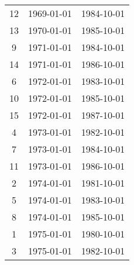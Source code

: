 % 
\begin{tabular}{ccc}
  \hline
  \hline
12 & 1969-01-01 & 1984-10-01 \\ 
  13 & 1970-01-01 & 1985-10-01 \\ 
  9 & 1971-01-01 & 1984-10-01 \\ 
  14 & 1971-01-01 & 1986-10-01 \\ 
  6 & 1972-01-01 & 1983-10-01 \\ 
  10 & 1972-01-01 & 1985-10-01 \\ 
  15 & 1972-01-01 & 1987-10-01 \\ 
  4 & 1973-01-01 & 1982-10-01 \\ 
  7 & 1973-01-01 & 1984-10-01 \\ 
  11 & 1973-01-01 & 1986-10-01 \\ 
  2 & 1974-01-01 & 1981-10-01 \\ 
  5 & 1974-01-01 & 1983-10-01 \\ 
  8 & 1974-01-01 & 1985-10-01 \\ 
  1 & 1975-01-01 & 1980-10-01 \\ 
  3 & 1975-01-01 & 1982-10-01 \\ 
   \hline
\end{tabular}
